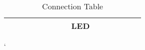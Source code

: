 \documentclass[journal,12pt,twocolumn]{IEEEtran}
\begin{document}
\begin{tableofcontents}
{\begin{table}[h]
{\begin{tabular}{|l|llll|llll|ll|llll|}
             & \multicolumn{1}{l|}{} & \multicolumn{1}{l|}{} & \multicolumn{1}{l|}{} &    & \multicolumn{1}{l|}{}  & \multicolumn{1}{l|}{}   & \multicolumn{1}{l|}{}  & LED  & \multicolumn{1}{l|}{}     &     & \multicolumn{1}{l|}{}  & \multicolumn{1}{l|}{}  & \multicolumn{1}{l|}{}   &    \\ \hline
\end{tabular}
}

 \vspace{3mm}
  \caption{Connection Table}
\label{table:3}
  `\end{table}
}
   \end{tableofcontents}
\end{document}
